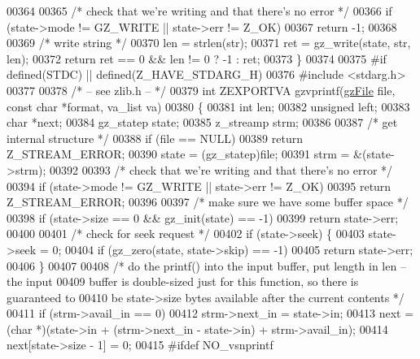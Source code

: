 \begin{DoxyCode}
00364 
00365     \textcolor{comment}{/* check that we're writing and that there's no error */}
00366     \textcolor{keywordflow}{if} (state->mode != GZ\_WRITE || state->err != Z\_OK)
00367         \textcolor{keywordflow}{return} -1;
00368 
00369     \textcolor{comment}{/* write string */}
00370     len = strlen(str);
00371     ret = gz\_write(state, str, len);
00372     \textcolor{keywordflow}{return} ret == 0 && len != 0 ? -1 : ret;
00373 \}
00374 
00375 \textcolor{preprocessor}{#if defined(STDC) || defined(Z\_HAVE\_STDARG\_H)}
00376 \textcolor{preprocessor}{#include <stdarg.h>}
00377 
00378 \textcolor{comment}{/* -- see zlib.h -- */}
00379 \textcolor{keywordtype}{int} ZEXPORTVA gzvprintf(\hyperlink{structgz_file__s}{gzFile} file, \textcolor{keyword}{const} \textcolor{keywordtype}{char} *format, va\_list va)
00380 \{
00381     \textcolor{keywordtype}{int} len;
00382     \textcolor{keywordtype}{unsigned} left;
00383     \textcolor{keywordtype}{char} *next;
00384     gz\_statep state;
00385     z\_streamp strm;
00386 
00387     \textcolor{comment}{/* get internal structure */}
00388     \textcolor{keywordflow}{if} (file == NULL)
00389         \textcolor{keywordflow}{return} Z\_STREAM\_ERROR;
00390     state = (gz\_statep)file;
00391     strm = &(state->strm);
00392 
00393     \textcolor{comment}{/* check that we're writing and that there's no error */}
00394     \textcolor{keywordflow}{if} (state->mode != GZ\_WRITE || state->err != Z\_OK)
00395         \textcolor{keywordflow}{return} Z\_STREAM\_ERROR;
00396 
00397     \textcolor{comment}{/* make sure we have some buffer space */}
00398     \textcolor{keywordflow}{if} (state->size == 0 && gz\_init(state) == -1)
00399         \textcolor{keywordflow}{return} state->err;
00400 
00401     \textcolor{comment}{/* check for seek request */}
00402     if (state->seek) \{
00403         state->seek = 0;
00404         \textcolor{keywordflow}{if} (gz\_zero(state, state->skip) == -1)
00405             \textcolor{keywordflow}{return} state->err;
00406     \}
00407 
00408     \textcolor{comment}{/* do the printf() into the input buffer, put length in len -- the input}
00409 \textcolor{comment}{       buffer is double-sized just for this function, so there is guaranteed to}
00410 \textcolor{comment}{       be state->size bytes available after the current contents */}
00411     \textcolor{keywordflow}{if} (strm->avail\_in == 0)
00412         strm->next\_in = state->in;
00413     next = (\textcolor{keywordtype}{char} *)(state->in + (strm->next\_in - state->in) + strm->avail\_in);
00414     next[state->size - 1] = 0;
00415 \textcolor{preprocessor}{#ifdef NO\_vsnprintf}

\end{DoxyCode}
